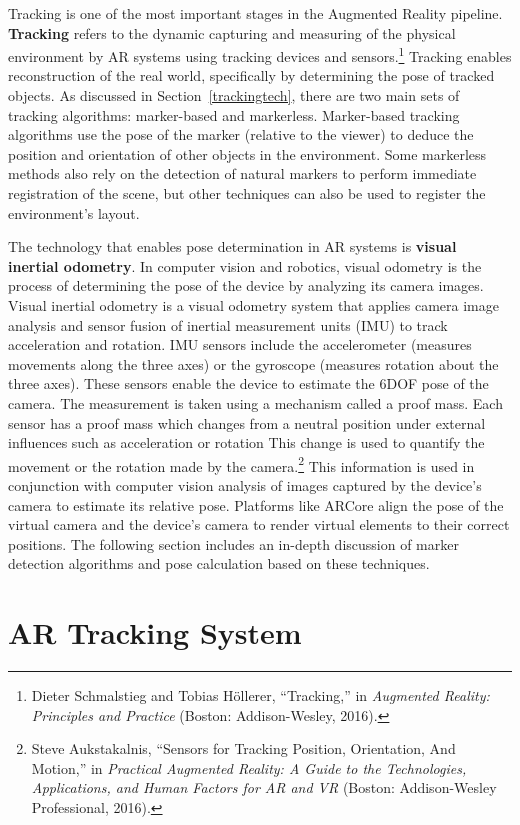 Tracking is one of the most important stages in the Augmented Reality pipeline. \textbf{Tracking} refers to the dynamic capturing and measuring of the physical environment by AR systems using tracking devices and sensors.\footnote{Dieter Schmalstieg and Tobias Höllerer, “Tracking,” in \textit{Augmented Reality: Principles and Practice} (Boston: Addison-Wesley, 2016).} Tracking enables reconstruction of the real world, specifically by determining the pose of tracked objects. As discussed in Section~\ref{trackingtech}, there are two main sets of tracking algorithms: marker-based and markerless. Marker-based tracking algorithms use the pose of the marker (relative to the viewer) to deduce the position and orientation of other objects in the environment. Some markerless methods also rely on the detection of natural markers to perform immediate registration of the scene, but other techniques can also be used to register the environment's layout.

The technology that enables pose determination in AR systems is \textbf{visual inertial odometry}. In computer vision and robotics, visual odometry is the process of determining the pose of the device by analyzing its camera images. Visual inertial odometry is a visual odometry system that applies camera image analysis and sensor fusion of inertial measurement units (IMU) to track acceleration and rotation. IMU sensors include the accelerometer (measures movements along the three axes) or the gyroscope (measures rotation about the three axes). These sensors enable the device to estimate the 6DOF pose of the camera. The measurement is taken using a mechanism called a proof mass. Each sensor has a proof mass which changes from a neutral position under external influences such as acceleration or rotation  This change is used to quantify the movement or the rotation made by the camera.\footnote{Steve Aukstakalnis, “Sensors for Tracking Position, Orientation, And Motion,” in \textit{Practical Augmented Reality: A Guide to the Technologies, Applications, and Human Factors for AR and VR} (Boston: Addison-Wesley Professional, 2016).} This information is used in conjunction with computer vision analysis of images captured by the device’s camera to estimate its relative pose. Platforms like ARCore align the pose of the virtual camera and the device's camera to render virtual elements to their correct positions. The following section includes an in-depth discussion of marker detection algorithms and pose calculation based on these techniques.

\section{AR Tracking System}
